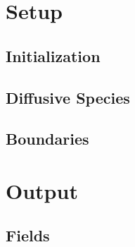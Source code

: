 




\section{Setup}

\subsection{Initialization}

\subsection{Diffusive Species}

\subsection{Boundaries}

\section{Output}

\subsection{Fields}

